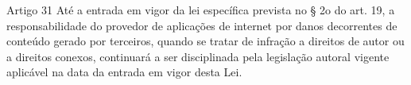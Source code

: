 \begin{frame}{Artigo 31}
Até a entrada em vigor da lei específica prevista no § 2o do art. 19, a responsabilidade do provedor de aplicações de internet por danos decorrentes de conteúdo gerado por terceiros, quando se tratar de infração a direitos de autor ou a direitos conexos, continuará a ser disciplinada pela legislação autoral vigente aplicável na data da entrada em vigor desta Lei.
\end{frame}